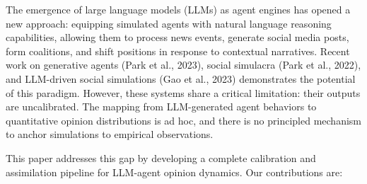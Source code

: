 \documentclass[
]{article}
\begin{document}
The emergence of large language models (LLMs) as agent engines has
opened a new approach: equipping simulated agents with natural language
reasoning capabilities, allowing them to process news events, generate
social media posts, form coalitions, and shift positions in response to
contextual narratives. Recent work on generative agents (Park et al.,
2023), social simulacra (Park et al., 2022), and LLM-driven social
simulations (Gao et al., 2023) demonstrates the potential of this
paradigm. However, these systems share a critical limitation: their
outputs are uncalibrated. The mapping from LLM-generated agent behaviors
to quantitative opinion distributions is ad hoc, and there is no
principled mechanism to anchor simulations to empirical observations.

This paper addresses this gap by developing a complete calibration and
assimilation pipeline for LLM-agent opinion dynamics. Our contributions
are:
\end{document}
